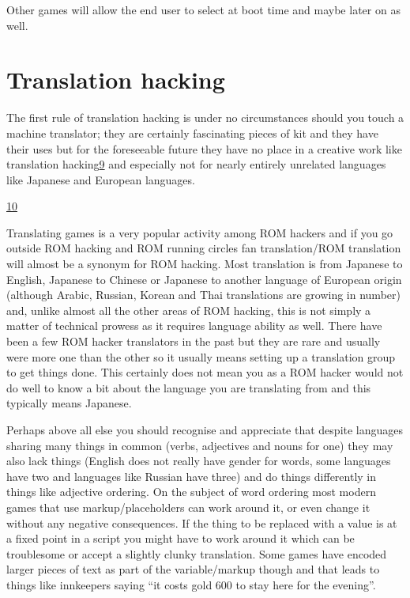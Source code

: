 \documentclass[
]{book}
\begin{document}
Other games will allow the end user to select at boot time and maybe later on as well.

\hypertarget{translation-hacking}{%
\section{Translation hacking}\label{translation-hacking}}

The first rule of translation hacking is under no circumstances should you touch a machine translator; they are certainly fascinating pieces of kit and they have their uses but for the foreseeable future they have no place in a creative work like translation hacking\href{romhacking202010.html\#fn9x0}{9} and especially not for nearly entirely unrelated languages like Japanese and European languages.

\href{romhacking202011.html\#fn10x0}{10}

Translating games is a very popular activity among ROM hackers and if you go outside ROM hacking and ROM running circles fan translation/ROM translation will almost be a synonym for ROM hacking. Most translation is from Japanese to English, Japanese to Chinese or Japanese to another language of European origin (although Arabic, Russian, Korean and Thai translations are growing in number) and, unlike almost all the other areas of ROM hacking, this is not simply a matter of technical prowess as it requires language ability as well. There have been a few ROM hacker translators in the past but they are rare and usually were more one than the other so it usually means setting up a translation group to get things done. This certainly does not mean you as a ROM hacker would not do well to know a bit about the language you are translating from and this typically means Japanese.

Perhaps above all else you should recognise and appreciate that despite languages sharing many things in common (verbs, adjectives and nouns for one) they may also lack things (English does not really have gender for words, some languages have two and languages like Russian have three) and do things differently in things like adjective ordering. On the subject of word ordering most modern games that use markup/placeholders can work around it, or even change it without any negative consequences. If the thing to be replaced with a value is at a fixed point in a script you might have to work around it which can be troublesome or accept a slightly clunky translation. Some games have encoded larger pieces of text as part of the variable/markup though and that leads to things like innkeepers saying ``it costs gold 600 to stay here for the evening''.
\end{document}

